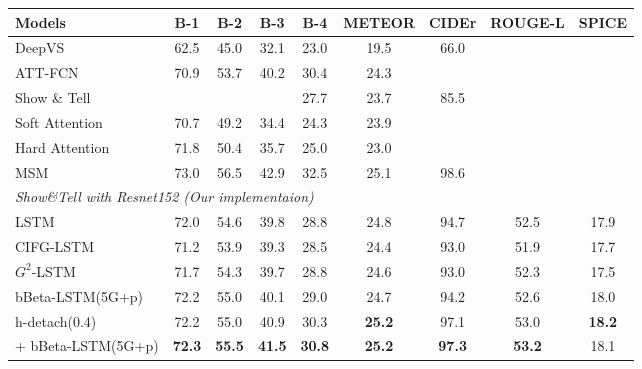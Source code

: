 \documentclass[letterpaper]{article} %
\begin{document}
%
\begin{table}[h!]
	\centering
	\begin{tabular}{lcccccccc}
		\toprule
		\textbf{Models} & \textbf{B-1} & \textbf{B-2} & \textbf{B-3} & \textbf{B-4} & \textbf{METEOR} & \textbf{CIDEr} & \textbf{ROUGE-L} & \textbf{SPICE}\\
		\midrule
		DeepVS~\cite{karpathy2015deep} &62.5 & 45.0 & 32.1 & 23.0 & 19.5 & 66.0& {\textemdash}& {\textemdash} \\
		ATT-FCN~\cite{you2016image} & 70.9 & 53.7 & 40.2 & 30.4 & 24.3 & {\textemdash}& {\textemdash}& {\textemdash}\\
		Show \& Tell~\cite{vinyals2015show} & {\textemdash}  & {\textemdash}    & {\textemdash} & 27.7 & 23.7 & 85.5 & {\textemdash}& {\textemdash}\\  
		Soft Attention~\cite{xu2015show}  & 70.7 & 49.2 & 34.4 & 24.3 & 23.9 & {\textemdash}& {\textemdash}& {\textemdash}\\
		Hard Attention~\cite{xu2015show}  & 71.8 & 50.4 & 35.7 & 25.0 & 23.0 & {\textemdash}& {\textemdash}& {\textemdash}\\
		MSM~\cite{yao2017boosting} & 73.0 & 56.5 & 42.9 & 32.5 & 25.1 & 98.6 & {\textemdash}& {\textemdash}\\
		\midrule
		\multicolumn{7}{l}{\emph{Show\&Tell with Resnet152 (Our implementaion)}}& {\textemdash}& {\textemdash}\\
		\hspace{10pt}LSTM & 72.0 & 54.6 & 39.8 & 28.8 & 24.8 &  94.7& 52.5& 17.9\\
		\hspace{10pt}CIFG-LSTM & 71.2 & 53.9 & 39.3 & 28.5 & 24.4 & 93.0& 51.9& 17.7\\
		\hspace{10pt}$G^{2}$-LSTM & 71.7 & 54.3 & 39.7 & 28.8 & 24.6 & 93.0& 52.3& 17.5\\
		\hspace{10pt}bBeta-LSTM(5G+p) &  72.2 &  55.0 &  40.1 &  29.0 & 24.7 & 94.2& 52.6& 18.0\\
		\hspace{10pt}h-detach(0.4)~\cite{hdetach2019} & 72.2 & 55.0 & 40.9 & 30.3 & \bfseries 25.2 & 97.1 & 53.0& \bfseries 18.2\\
		\hspace{10pt}\hspace{1pt} + bBeta-LSTM(5G+p)  & \bfseries 72.3 & \bfseries 55.5 & \bfseries 41.5 & \bfseries 30.8 & \bfseries 25.2 & \bfseries 97.3 & \bfseries 53.2&  18.1\\

\end{tabular}
\end{table}
\end{document}
